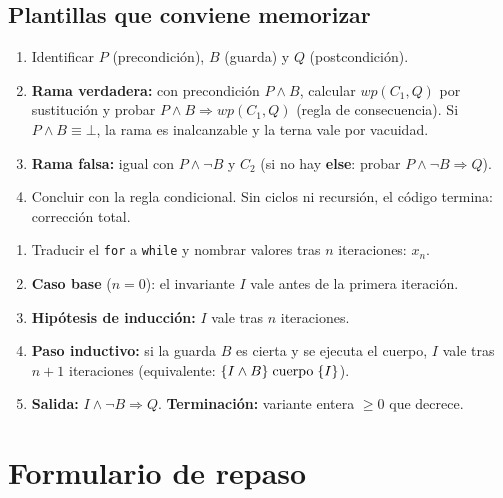 \subsection*{Plantillas que conviene memorizar}
\begin{formulario}
\begin{enumerate}[leftmargin=*]
\item Identificar $P$ (precondición), $B$ (guarda) y $Q$ (postcondición).
\item \textbf{Rama verdadera:} con precondición $P\land B$, calcular $wp(C_1,Q)$ por sustitución y probar $P\land B\Rightarrow wp(C_1,Q)$ (regla de consecuencia). Si $P\land B\equiv\bot$, la rama es inalcanzable y la terna vale por vacuidad.
\item \textbf{Rama falsa:} igual con $P\land\neg B$ y $C_2$ (si no hay \textbf{else}: probar $P\land\neg B\Rightarrow Q$).
\item Concluir con la regla condicional. Sin ciclos ni recursión, el código termina: corrección total.
\end{enumerate}
\end{formulario}

\begin{formulario}
\begin{enumerate}[leftmargin=*]
\item Traducir el \texttt{for} a \texttt{while} y nombrar valores tras $n$ iteraciones: $x_n$.
\item \textbf{Caso base} ($n=0$): el invariante $I$ vale antes de la primera iteración.
\item \textbf{Hipótesis de inducción:} $I$ vale tras $n$ iteraciones.
\item \textbf{Paso inductivo:} si la guarda $B$ es cierta y se ejecuta el cuerpo, $I$ vale tras $n+1$ iteraciones (equivalente: $\{I\land B\}\;\text{cuerpo}\;\{I\}$).
\item \textbf{Salida:} $I\land\neg B\Rightarrow Q$. \quad \textbf{Terminación:} variante entera $\ge0$ que decrece.
\end{enumerate}
\end{formulario}

\newpage
\section*{Formulario de repaso}

